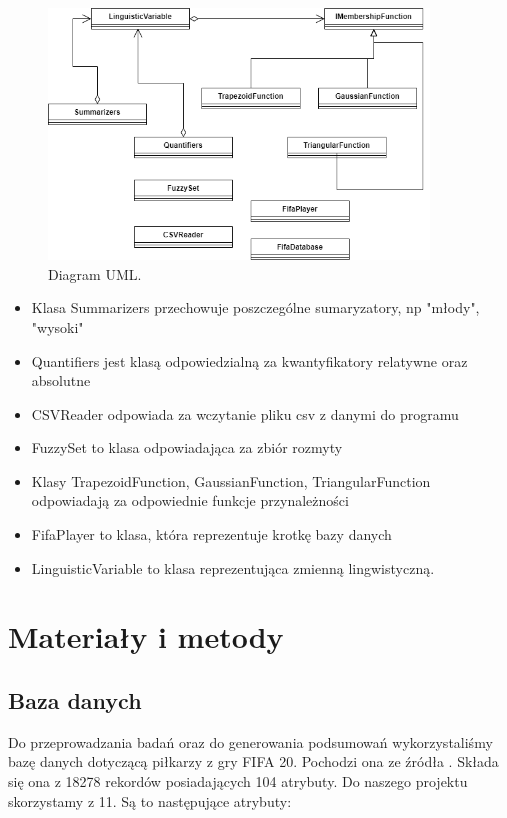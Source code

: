 \documentclass{classrep}
\begin{document}
	\begin{figure}[h!]
		\centering
		\includegraphics[width=0.9\textwidth]{../uml/uml.png}
		\caption{Diagram UML.}
		\label{uml}
	\end{figure}
	
	\begin{itemize}
		\item Klasa Summarizers przechowuje poszczególne sumaryzatory, np "młody", "wysoki" 
		\item Quantifiers jest klasą odpowiedzialną za kwantyfikatory relatywne oraz absolutne
		\item CSVReader odpowiada za wczytanie pliku csv z danymi do programu
		\item FuzzySet to klasa odpowiadająca za zbiór rozmyty
		\item Klasy TrapezoidFunction, GaussianFunction, TriangularFunction odpowiadają za odpowiednie funkcje przynależności
		\item FifaPlayer to klasa, która reprezentuje krotkę bazy danych
		\item LinguisticVariable to klasa reprezentująca zmienną lingwistyczną.
	\end{itemize}
	
	\section{Materiały i metody} %
	\subsection{Baza danych}
	Do przeprowadzania badań oraz do generowania podsumowań wykorzystaliśmy bazę danych dotyczącą piłkarzy z gry FIFA 20. Pochodzi ona ze źródła \cite{baza}. Składa się ona z 18278 rekordów posiadających 104 atrybuty. Do naszego projektu skorzystamy z 11. Są to następujące atrybuty:
	
\end{document}
